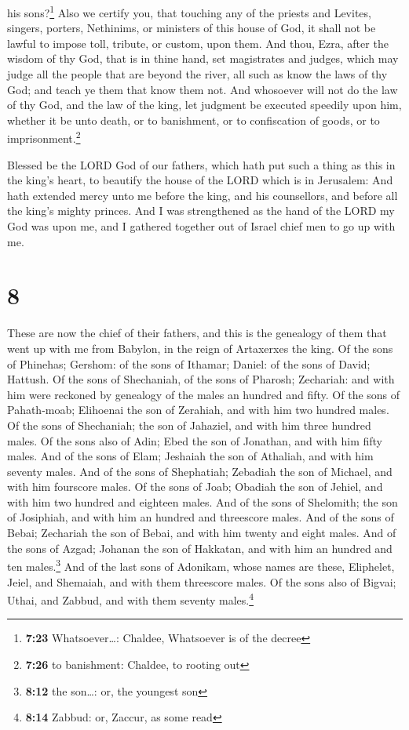 his sons?\footnote{\textbf{7:23} Whatsoever\ldots: Chaldee, Whatsoever
  is of the decree}  Also we certify you, that touching
any of the priests and Levites, singers, porters, Nethinims, or
ministers of this house of God, it shall not be lawful to impose toll,
tribute, or custom, upon them.  And thou, Ezra, after the
wisdom of thy God, that is in thine hand, set magistrates and judges,
which may judge all the people that are beyond the river, all such as
know the laws of thy God; and teach ye them that know them not.
 And whosoever will not do the law of thy God, and the
law of the king, let judgment be executed speedily upon him, whether it
be unto death, or to banishment, or to confiscation of goods, or to
imprisonment.\footnote{\textbf{7:26} to banishment: Chaldee, to rooting
  out}

 Blessed be the LORD God of our fathers, which hath put
such a thing as this in the king's heart, to beautify the house of the
LORD which is in Jerusalem:  And hath extended mercy unto
me before the king, and his counsellors, and before all the king's
mighty princes. And I was strengthened as the hand of the LORD my God
was upon me, and I gathered together out of Israel chief men to go up
with me.

\hypertarget{section-7}{%
\section{8}\label{section-7}}

 These are now the chief of their fathers, and this is the
genealogy of them that went up with me from Babylon, in the reign of
Artaxerxes the king.  Of the sons of Phinehas; Gershom: of
the sons of Ithamar; Daniel: of the sons of David; Hattush.
 Of the sons of Shechaniah, of the sons of Pharosh;
Zechariah: and with him were reckoned by genealogy of the males an
hundred and fifty.  Of the sons of Pahath-moab; Elihoenai
the son of Zerahiah, and with him two hundred males.  Of
the sons of Shechaniah; the son of Jahaziel, and with him three hundred
males.  Of the sons also of Adin; Ebed the son of
Jonathan, and with him fifty males.  And of the sons of
Elam; Jeshaiah the son of Athaliah, and with him seventy males.
 And of the sons of Shephatiah; Zebadiah the son of
Michael, and with him fourscore males.  Of the sons of
Joab; Obadiah the son of Jehiel, and with him two hundred and eighteen
males.  And of the sons of Shelomith; the son of
Josiphiah, and with him an hundred and threescore males. 
And of the sons of Bebai; Zechariah the son of Bebai, and with him
twenty and eight males.  And of the sons of Azgad;
Johanan the son of Hakkatan, and with him an hundred and ten
males.\footnote{\textbf{8:12} the son\ldots: or, the youngest son}
 And of the last sons of Adonikam, whose names are these,
Eliphelet, Jeiel, and Shemaiah, and with them threescore males.
 Of the sons also of Bigvai; Uthai, and Zabbud, and with
them seventy males.\footnote{\textbf{8:14} Zabbud: or, Zaccur, as some
  read}

